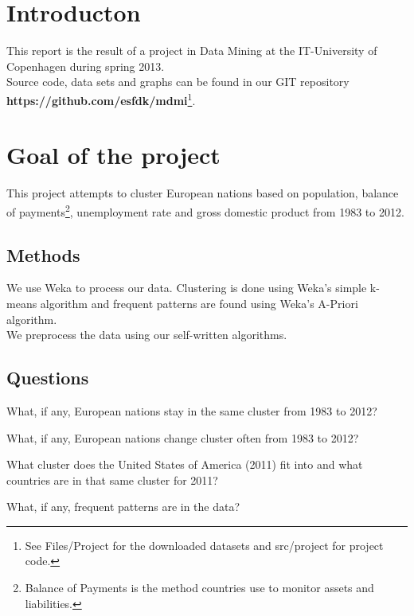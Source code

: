 \section{Introducton}
\label{Intro}
This report is the result of a project in Data Mining at the IT-University of Copenhagen during spring 2013.
\\Source code, data sets and graphs can be found in our GIT repository \textbf{https://github.com/esfdk/mdmi}\footnote{See Files/Project for the downloaded datasets and src/project for project code.}. 

\section{Goal of the project}
This project attempts to cluster European nations based on population, balance of payments\footnote{Balance of Payments is the method countries use to monitor assets and liabilities.}, unemployment rate and gross domestic product from 1983 to 2012.

\subsection{Methods}
We use Weka to process our data. Clustering is done using Weka's simple k-means algorithm and frequent patterns are found using Weka's A-Priori algorithm.
\\We preprocess the data using our self-written algorithms.

\subsection{Questions}
\label{Intro_que}
\begin{my_itemize}
\item What, if any, European nations stay in the same cluster from 1983 to 2012?
\item What, if any, European nations change cluster often from 1983 to 2012?
\item What cluster does the United States of America (2011) fit into and what countries are in that same cluster for 2011?
\item What, if any, frequent patterns are in the data?
\end{my_itemize}
